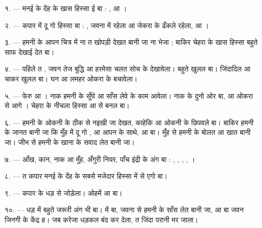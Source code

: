 \VUsaut{4.0mm}
\VUsaut{2.0mm}

\VUsaut{2.4mm}
\VUsaut{3.0mm}

\VUsaut{3.0mm}

१. --- मनई के देंह के खास हिस्सा ई बा : , 
आ ।

२. --- कपार में दू गो हिस्सा बा : , जवना में
 रहेला आ जेकरा के  ढँकले रहेला, आ
।

३. --- हमनी के आपन चित्र में ना त खोपड़ी देखत बानी जा ना भेजा ; बाकिर
चेहरा के खास हिस्सा बहुते साफ देखाई देत बा।

४. --- पहिले त , जवन तेज बुद्धि आ हरमेसा चलत सोच के
देखावेला।  बहुते खुलल बा।  जिंदादिल आ चाकर
खुलल बा। घन  आ लमहर  ओकरा के बचावेला।

५. --- फेरु  आ । नाक हमनी के सूँघे आ साँस
लेवे के काम आवेला। नाक के दुनो ओर  बा, आ ओकरा से आगे
। चेहरा के नीचला हिस्सा  आ  से
बनल बा।

६. --- हमनी के ओकनी के ठीक से नइखी जा देखत, काहेकि  आ
 ओकनी के छिपवले बा। बाकिर हमनी के जानत बानी जा कि मुँह
में दू गो ,  आ 
आपन  के साथे, आ  बा। मुँह से हमनी के बोलत आ
खात बानी जा। जीभ से हमनी के खाना के सवाद लेत बानी जा।

७. --- आँख, कान, नाक आ मुँह, अँगुरी नियर, पाँच इंद्री के अंग बा :
, , , , ।

८. --- त कपार मनई के देंह के सबसे मजेदार हिस्सा में से एगो बा।

\VUsaut{4.4mm}
\VUsaut{3.0mm}

९. ---  कपार के धड़ से जोड़ेला। ओहमें  आ
 बा।

१०. --- धड़ में बहुते जरूरी अंग भी बा।  में
 बा, जवना से हमनी के साँस लेत बानी जा, आ 
बा जवन जिनगी के केंद्र ह। जब करेजा धड़कल बंद कर देला, त जिंदा परानी मर
जाला।

